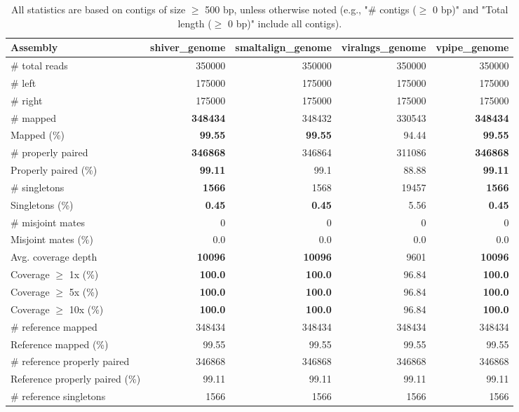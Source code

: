 \documentclass[12pt,a4paper]{article}
\begin{document}
\begin{table}[ht]
\begin{center}
\caption{All statistics are based on contigs of size $\geq$ 500 bp, unless otherwise noted (e.g., "\# contigs ($\geq$ 0 bp)" and "Total length ($\geq$ 0 bp)" include all contigs).}
\begin{tabular}{|l*{4}{|r}|}
\hline
Assembly & shiver\_genome & smaltalign\_genome & viralngs\_genome & vpipe\_genome \\ \hline
\# total reads & 350000 & 350000 & 350000 & 350000 \\ \hline
\# left & 175000 & 175000 & 175000 & 175000 \\ \hline
\# right & 175000 & 175000 & 175000 & 175000 \\ \hline
\# mapped & {\bf 348434} & 348432 & 330543 & {\bf 348434} \\ \hline
Mapped (\%) & {\bf 99.55} & {\bf 99.55} & 94.44 & {\bf 99.55} \\ \hline
\# properly paired & {\bf 346868} & 346864 & 311086 & {\bf 346868} \\ \hline
Properly paired (\%) & {\bf 99.11} & 99.1 & 88.88 & {\bf 99.11} \\ \hline
\# singletons & {\bf 1566} & 1568 & 19457 & {\bf 1566} \\ \hline
Singletons (\%) & {\bf 0.45} & {\bf 0.45} & 5.56 & {\bf 0.45} \\ \hline
\# misjoint mates & 0 & 0 & 0 & 0 \\ \hline
Misjoint mates (\%) & 0.0 & 0.0 & 0.0 & 0.0 \\ \hline
Avg. coverage depth & {\bf 10096} & {\bf 10096} & 9601 & {\bf 10096} \\ \hline
Coverage $\geq$ 1x (\%) & {\bf 100.0} & {\bf 100.0} & 96.84 & {\bf 100.0} \\ \hline
Coverage $\geq$ 5x (\%) & {\bf 100.0} & {\bf 100.0} & 96.84 & {\bf 100.0} \\ \hline
Coverage $\geq$ 10x (\%) & {\bf 100.0} & {\bf 100.0} & 96.84 & {\bf 100.0} \\ \hline
\# reference mapped & 348434 & 348434 & 348434 & 348434 \\ \hline
Reference mapped (\%) & 99.55 & 99.55 & 99.55 & 99.55 \\ \hline
\# reference properly paired & 346868 & 346868 & 346868 & 346868 \\ \hline
Reference properly paired (\%) & 99.11 & 99.11 & 99.11 & 99.11 \\ \hline
\# reference singletons & 1566 & 1566 & 1566 & 1566 \\ \hline

\end{tabular}
\end{center}
\end{table}
\end{document}
